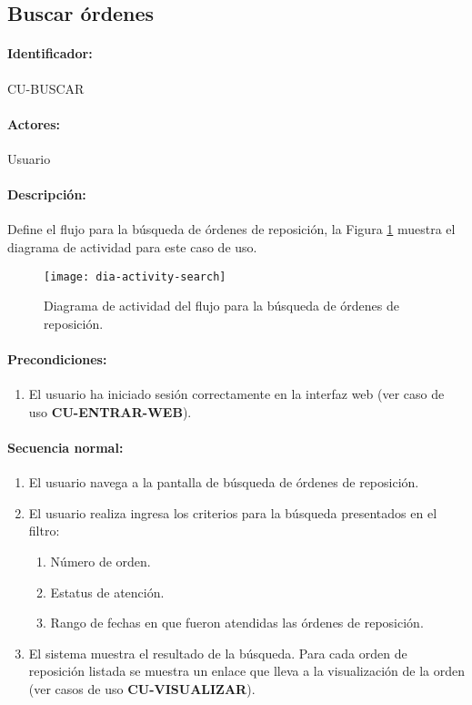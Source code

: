 \subsection{Buscar órdenes}\label{cu-buscar}
\paragraph{Identificador:}
CU-BUSCAR
\paragraph{Actores:}
Usuario
\paragraph{Descripción:}
Define el flujo para la búsqueda de órdenes de reposición, la Figura \ref{fig:dia-activity-search} muestra el diagrama de actividad para este caso de uso.
\begin{figure}[h]
  \centering
  \texttt{[image: dia-activity-search]}
  \caption{Diagrama de actividad del flujo para la búsqueda de órdenes de reposición.}
  \label{fig:dia-activity-search}
\end{figure}
\paragraph{Precondiciones:}
\begin{enumerate}
  \item El usuario ha iniciado sesión correctamente en la interfaz web (ver caso de uso \textbf{CU-ENTRAR-WEB}).
\end{enumerate}
\paragraph{Secuencia normal:}
\begin{enumerate}
  \item El usuario navega a la pantalla de búsqueda de órdenes de reposición.
  \item El usuario realiza ingresa los criterios para la búsqueda presentados en el filtro:
  \begin{enumerate}
    \item Número de orden.
    \item Estatus de atención.
    \item Rango de fechas en que fueron atendidas las órdenes de reposición.
  \end{enumerate}
  \item El sistema muestra el resultado de la búsqueda. Para cada orden de reposición listada se muestra un enlace que lleva a la visualización de la orden (ver casos de uso \textbf{CU-VISUALIZAR}).
\end{enumerate}
